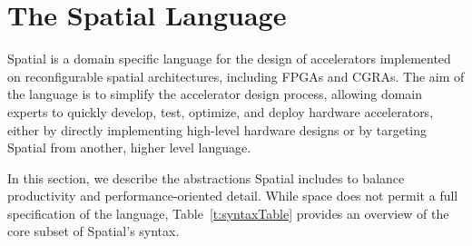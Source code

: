 \section{The Spatial Language}
\label{language}

Spatial is a domain specific language for the design of accelerators implemented on reconfigurable spatial architectures, including FPGAs and CGRAs. 
The aim of the language is to simplify the accelerator design process, 
allowing domain experts to quickly develop, test, optimize, and deploy hardware accelerators, either by 
directly implementing high-level hardware designs or by targeting Spatial from another, higher level language.

In this section, we describe the abstractions Spatial includes to balance productivity and performance-oriented detail.
While space does not permit a full specification of the language, Table~\ref{t:syntaxTable} provides an overview of the core subset of Spatial's syntax. 












